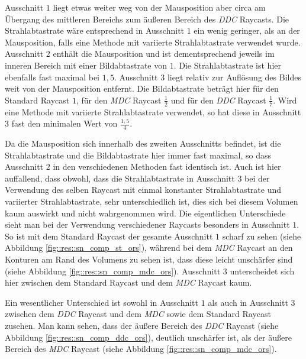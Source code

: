 Ausschnitt $1$ liegt etwas weiter weg von der Mausposition aber circa am Übergang des mittleren Bereichs zum äußeren Bereich des \emph{DDC} Raycasts.
Die Strahlabtastrate wäre entsprechend in Ausschnitt $1$ ein wenig geringer, als an der Mausposition, falls eine Methode mit variierte Strahlabtastrate verwendet wurde.
Ausschnitt $2$ enthält die Mausposition und ist dementsprechend jeweils im inneren Bereich mit einer Bildabtastrate von $1$.
Die Strahlabtastrate ist hier ebenfalls fast maximal bei $1,5$.
Ausschnitt $3$ liegt relativ zur Auflösung des Bildes weit von der Mausposition entfernt.
Die Bildabtastrate beträgt hier für den Standard Raycast $1$, für den \emph{MDC} Raycast $\frac{1}{2}$ und für den \emph{DDC} Raycast $\frac{1}{7}$.
Wird eine Methode mit variierte Strahlabtastrate verwendet, so hat diese in Ausschnitt $3$ fast den minimalen Wert von $\frac{1,5}{4}$.

Da die Mausposition sich innerhalb des zweiten Ausschnitts befindet, ist die Strahlabtastrate und die Bildabtastrate hier immer fast maximal, so dass Ausschnitt $2$ in den verschiedenen Methoden fast identisch ist.
Auch ist hier auffallend, dass obwohl, dass die Strahlabtastrate in Ausschnitt $3$ bei der Verwendung des selben Raycast mit einmal konstanter Strahlabtastrate und variierter Strahlabtastrate, sehr unterschiedlich ist, dies sich bei diesem Volumen kaum auswirkt und nicht wahrgenommen wird.
Die eigentlichen Unterschiede sieht man bei der Verwendung verschiedener Raycasts besonders in Ausschnitt $1$.
So ist mit dem Standard Raycast der gesamte Ausschnitt $1$ scharf zu sehen (siehe Abbildung \ref{fig::res::sn_comp_st_ors}), während bei dem \emph{MDC} Raycast an den Konturen am Rand des Volumens zu sehen ist, dass diese leicht unschärfer sind (siehe Abbildung \ref{fig::res::sn_comp_mdc_ors}).
Ausschnitt $3$ unterscheidet sich hier zwischen dem Standard Raycast und dem \emph{MDC} Raycast kaum.

Ein wesentlicher Unterschied ist sowohl in Ausschnitt $1$ als auch in Ausschnitt $3$ zwischen dem \emph{DDC} Raycast und dem \emph{MDC} sowie dem Standard Raycast zusehen.
Man kann sehen, dass der äußere Bereich des \emph{DDC} Raycast (siehe Abbildung \ref{fig::res::sn_comp_ddc_ors}), deutlich unschärfer ist, als der äußere Bereich des \emph{MDC} Raycast (siehe Abbildung \ref{fig::res::sn_comp_mdc_ors}).

